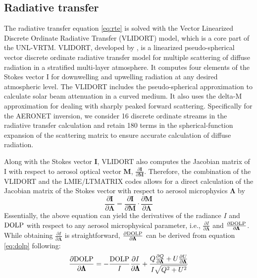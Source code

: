 \subsection{Radiative transfer} \label{subsec:vlidort}

The radiative transfer equation \eqref{eq:rte} is solved with the 
Vector Linearized Discrete Ordinate Radiative Transfer (VLIDORT)
model, which is a core part of the UNL-VRTM. VLIDORT, 
developed by \citet{Spurr06}, is a
linearized pseudo-spherical vector discrete ordinate radiative transfer
model for multiple scattering of diffuse radiation in a stratified
multi-layer atmosphere. It computes four elements of the Stokes vector I
for downwelling and upwelling radiation at any desired atmospheric
level. The VLIDORT includes the pseudo-spherical approximation to
calculate solar beam attenuation in a curved medium. It also uses the
delta-M approximation for dealing with sharply peaked forward
scattering. Specifically for the AERONET inversion, we consider 16
discrete ordinate streams in the radiative transfer calculation and
retain 180 terms in the spherical-function expansion of the scattering
matrix to ensure accurate calculation of diffuse radiation. 

Along with the Stokes vector $\mathbf{I}$, VLIDORT also computes the Jacobian
matrix of I with respect to aerosol optical vector $\mathbf{M}$, 
$\frac{\partial\mathbf{I}}{\partial\mathbf{M}}$. Therefore,
the combination of the VLIDORT and the LMIE/LTMATRIX codes allows for a
direct calculation of the Jacobian matrix of the Stokes vector with
respect to aerosol microphysics $\pmb{\Lambda}$ by
\begin{equation}
\frac{\partial\mathbf{I}}{\partial\pmb{\Lambda}} =
\frac{\partial\mathbf{I}}{\partial\mathbf{M}}
\cdot \frac{\partial\mathbf{M}}{\partial\pmb{\Lambda}}
\label{eq:adj-i}
\end{equation}
Essentially, the above equation can yield the derivatives of the
radiance $I$ and $\text{DOLP}$ with respect to any aerosol microphysical parameter,
i.e., $\frac{\partial{I}}{\partial\pmb{\Lambda}}$ and 
$\frac{\partial\text{DOLP}}{\partial\pmb{\Lambda}}$. 
While obtaining $\frac{\partial{I}}{\partial\pmb{\Lambda}}$ is straightforward,
$\frac{\partial\text{DOLP}}{\partial\pmb{\Lambda}}$ can be derived from equation 
\eqref{eq:dolp} following:
\begin{equation}
\frac{\partial\text{DOLP}}{\partial\pmb{\Lambda}} = 
-\frac{\text{DOLP}}{I} \frac{\partial{I}}{\partial\pmb{\Lambda}} +
\frac{Q\frac{\partial{Q}}{\partial\pmb{\Lambda}}+U\frac{\partial{U}}{\partial\pmb{\Lambda}}}{I\sqrt{Q^2+U^2}}
\label{eq:adj-dolp}
\end{equation}

